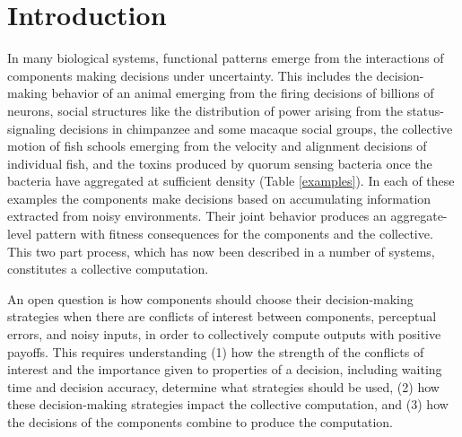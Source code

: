 \documentclass{article}
\begin{document}
\section*{Introduction} 

In many biological systems, functional patterns emerge from the interactions of components making decisions under uncertainty. This includes the decision-making behavior of an animal emerging from the firing decisions of billions of neurons, social structures like the distribution of power arising from the status-signaling decisions in chimpanzee and some macaque social groups, the collective motion of fish schools emerging from the velocity and alignment decisions of individual fish, and the toxins produced by quorum sensing bacteria once the bacteria have aggregated at sufficient density (Table \ref{examples}). In each of these examples the components make decisions based on accumulating information extracted from noisy environments. Their joint behavior produces an aggregate-level pattern with fitness consequences for the components and the collective. This two part process, which has now been described in a number of systems, constitutes a collective computation.

An open question is how components should choose their decision-making strategies when there are conflicts of interest between components, perceptual errors, and noisy inputs, in order to collectively compute outputs with positive payoffs. This requires understanding (1) how the strength of the  conflicts of interest and the importance given to properties of a decision, including waiting time and decision accuracy, determine what strategies should be used, (2) how these decision-making strategies impact the collective computation, and (3) how the decisions of the components combine to produce the computation. 
\end{document}

